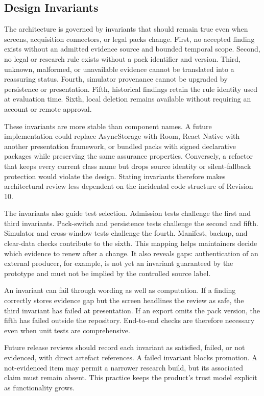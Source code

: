 \subsection{Design Invariants}

The architecture is governed by invariants that should remain true even when screens, acquisition connectors, or legal packs change. First, no accepted finding exists without an admitted evidence source and bounded temporal scope. Second, no legal or research rule exists without a pack identifier and version. Third, unknown, malformed, or unavailable evidence cannot be translated into a reassuring status. Fourth, simulator provenance cannot be upgraded by persistence or presentation. Fifth, historical findings retain the rule identity used at evaluation time. Sixth, local deletion remains available without requiring an account or remote approval.

These invariants are more stable than component names. A future implementation could replace AsyncStorage with Room, React Native with another presentation framework, or bundled packs with signed declarative packages while preserving the same assurance properties. Conversely, a refactor that keeps every current class name but drops source identity or silent-fallback protection would violate the design. Stating invariants therefore makes architectural review less dependent on the incidental code structure of Revision 10.

The invariants also guide test selection. Admission tests challenge the first and third invariants. Pack-switch and persistence tests challenge the second and fifth. Simulator and cross-window tests challenge the fourth. Manifest, backup, and clear-data checks contribute to the sixth. This mapping helps maintainers decide which evidence to renew after a change. It also reveals gaps: authentication of an external producer, for example, is not yet an invariant guaranteed by the prototype and must not be implied by the controlled source label.

An invariant can fail through wording as well as computation. If a finding correctly stores evidence gap but the screen headlines the review as safe, the third invariant has failed at presentation. If an export omits the pack version, the fifth has failed outside the repository. End-to-end checks are therefore necessary even when unit tests are comprehensive.

Future release reviews should record each invariant as satisfied, failed, or not evidenced, with direct artefact references. A failed invariant blocks promotion. A not-evidenced item may permit a narrower research build, but its associated claim must remain absent. This practice keeps the product's trust model explicit as functionality grows.

